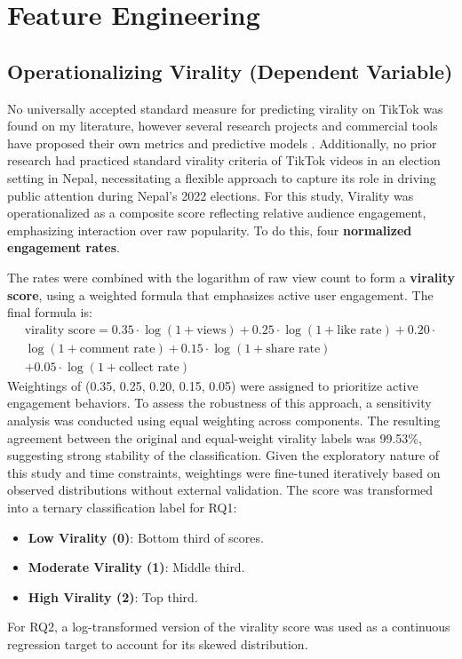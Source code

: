 \documentclass[12pt,a4paper]{report}
\begin{document}
\section{Feature Engineering}
\subsection{Operationalizing Virality (Dependent Variable)}
No universally accepted standard measure for predicting virality on TikTok was found on my literature, however several research projects and commercial tools have proposed their own metrics and predictive models \parencite{roring2024decoding, SahJordan2025DecodingReddit}. Additionally, no prior research had practiced standard virality criteria of TikTok videos in an election setting in Nepal, necessitating a flexible approach to capture its role in driving public attention during Nepal’s 2022 elections. For this study, Virality was operationalized as a composite score reflecting relative audience engagement, emphasizing interaction over raw popularity. To do this, four \textbf{normalized engagement rates}.

The rates were combined with the logarithm of raw view count to form a \textbf{virality score}, using a weighted formula that emphasizes active user engagement. The final formula is:
\begin{multline}
\text{virality score} = 0.35 \cdot \log(1 + \text{views}) + 0.25 \cdot \log(1 + \text{like rate}) + 0.20 \cdot \\ \log(1 + \text{comment rate}) + 0.15 \cdot \log(1 + \text{share rate}) \\ + 0.05 \cdot \log(1 + \text{collect rate})
\end{multline}
Weightings of (0.35, 0.25, 0.20, 0.15, 0.05) were assigned to prioritize active engagement behaviors. To assess the robustness of this approach, a sensitivity analysis was conducted using equal weighting across components. The resulting agreement between the original and equal-weight virality labels was 99.53\%, suggesting strong stability of the classification. Given the exploratory nature of this study and time constraints, weightings were fine-tuned iteratively based on observed distributions without external validation.
The score was transformed into a ternary classification label for RQ1:
\begin{itemize}
    \item \textbf{Low Virality (0)}: Bottom third of scores.
    \item \textbf{Moderate Virality (1)}: Middle third.
    \item \textbf{High Virality (2)}: Top third.
\end{itemize}
For RQ2, a log-transformed version of the virality score was used as a continuous regression target to account for its skewed distribution.
\newpage
\end{document}
